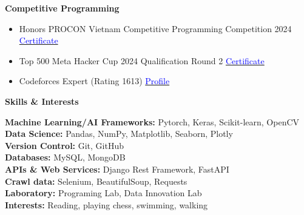 \documentclass[11pt]{article}
\begin{document}
    \textbf{Competitive Programming} 
    \begin{itemize}[noitemsep, topsep=0pt, partopsep=0pt, parsep=0pt]
        \item Honors PROCON Vietnam Competitive Programming Competition 2024 
        \hfill \href{https://drive.google.com/file/d/1wuA_vBddyVc0gTyh4YKBaBAhdfkgFYwT/view?usp=sharing}{\textcolor{blue}{Certificate}} 
        
        \item Top 500 Meta Hacker Cup 2024 Qualification Round 2 \hfill
        \href{https://www.facebook.com/codingcompetitions/hacker-cup/2024/certificate/484986933064775?source=facebook}{\textcolor{blue}{Certificate}}
    
        \item Codeforces Expert (Rating 1613) \hfill
        \href{https://codeforces.com/profile/taitruong256}{\textcolor{blue}{Profile}}
    \end{itemize}
    

    







    \begin{center}
        \hrulefill
    \end{center}
    \begin{center}
        \textbf{Skills \& Interests}
    \end{center}
    
    \textbf{Machine Learning/AI Frameworks:} Pytorch, Keras, Scikit-learn, OpenCV \\
    \textbf{Data Science:} Pandas, NumPy, Matplotlib, Seaborn, Plotly\\
    \textbf{Version Control:} Git, GitHub\\
    \textbf{Databases:} MySQL, MongoDB\\
    \textbf{APIs \& Web Services:} Django Rest Framework, FastAPI\\
    \textbf{Crawl data:} Selenium, BeautifulSoup, Requests\\
    \textbf{Laboratory:} Programing Lab, Data Innovation Lab \\
    \textbf{Interests:} Reading, playing chess, swimming, walking \\

\end{document}
